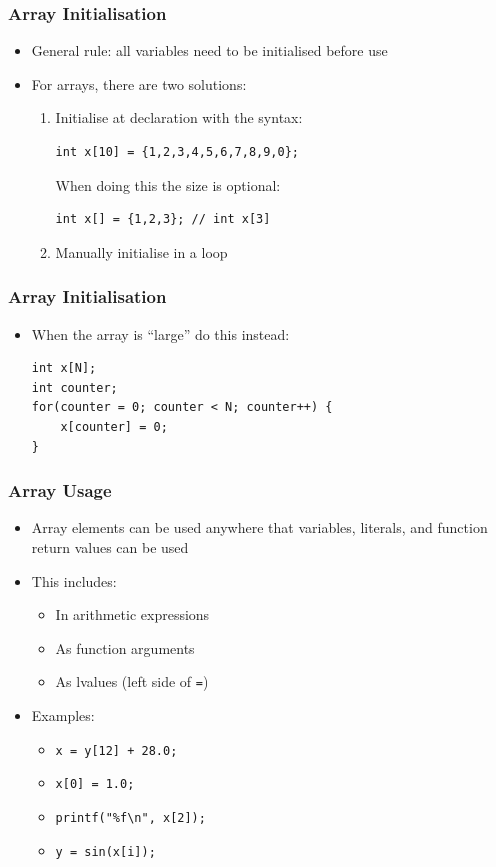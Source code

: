 \documentclass[14pt]{beamer}
\begin{document}
\begin{frame}[fragile]
\frametitle{Array Initialisation}
\begin{itemize}
\item General rule: all variables need to be initialised before use
\item For arrays, there are two solutions:
	\begin{enumerate}
		\item Initialise at declaration with the syntax:
		\begin{lstlisting}[style=CStyle]
int x[10] = {1,2,3,4,5,6,7,8,9,0};
\end{lstlisting}
		When doing this the size is optional:
		\begin{lstlisting}[style=CStyle]
int x[] = {1,2,3}; // int x[3]
\end{lstlisting}
		\item Manually initialise in a loop
	\end{enumerate}
\end{itemize}
\end{frame}

\begin{frame}[fragile]
\frametitle{Array Initialisation}
\begin{itemize}
\item When the array is ``large'' do this instead:
\begin{lstlisting}[style=CStyle]
int x[N];
int counter;
for(counter = 0; counter < N; counter++) {
	x[counter] = 0;
}
\end{lstlisting}
\end{itemize}
\end{frame}

\begin{frame}[fragile]
\frametitle{Array Usage}
\begin{itemize}
\item Array elements can be used anywhere that variables, literals, and function return values can be used
\item This includes:
	\begin{itemize}
		\item In arithmetic expressions
		\item As function arguments
		\item As lvalues (left side of \texttt{=})
	\end{itemize}
\item Examples:
	\begin{itemize}
		\item \texttt{x = y[12] + 28.0;}
		\item \texttt{x[0] = 1.0;}
		\item \texttt{printf("\%f\textbackslash n", x[2]);}
		\item \texttt{y = sin(x[i]);}
	\end{itemize}
\end{itemize}
\end{frame}
\end{document}
